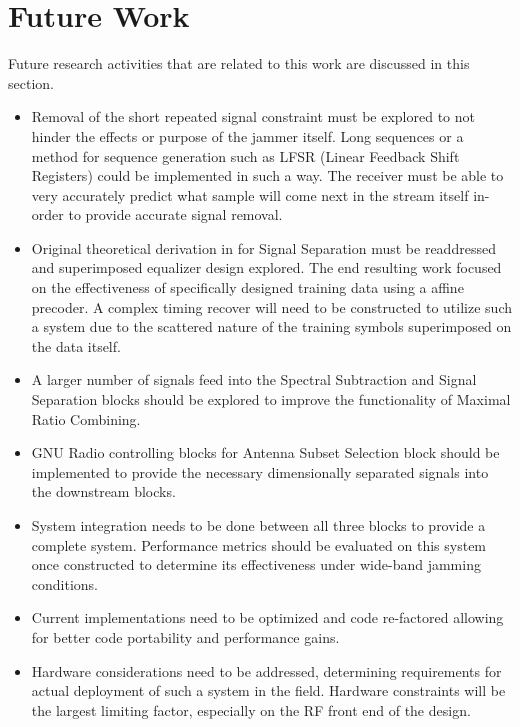 \section{Future Work}

Future research activities that are related to this work are discussed in this section.

\begin{itemize}

\item Removal of the short repeated signal constraint must be explored to not hinder the effects or purpose of the jammer itself.  Long sequences or a method for sequence generation such as LFSR (Linear Feedback Shift Registers) could be implemented in such a way.  The receiver must be able to very accurately predict what sample will come next in the stream itself in-order to provide accurate signal removal.

\item Original theoretical derivation in \cite{skrkantPHD} for Signal Separation must be readdressed and superimposed equalizer design explored.  The end resulting work focused on the effectiveness of specifically designed training data using a affine precoder.  A complex timing recover will need to be constructed to utilize such a system due to the scattered nature of the training symbols superimposed on the data itself.

\item A larger number of signals feed into the Spectral Subtraction and Signal Separation blocks should be explored to improve the functionality of Maximal Ratio Combining.

\item GNU Radio controlling blocks for Antenna Subset Selection block should be implemented to provide the necessary dimensionally separated signals into the downstream blocks.

\item System integration needs to be done between all three blocks to provide a complete system.  Performance metrics should be evaluated on this system once constructed to determine its effectiveness under wide-band jamming conditions.

\item Current implementations need to be optimized and code re-factored allowing for better code portability and performance gains.

\item Hardware considerations need to be addressed, determining requirements for actual deployment of such a system in the field.  Hardware constraints will be the largest limiting factor, especially on the RF front end of the design.



\end{itemize}
